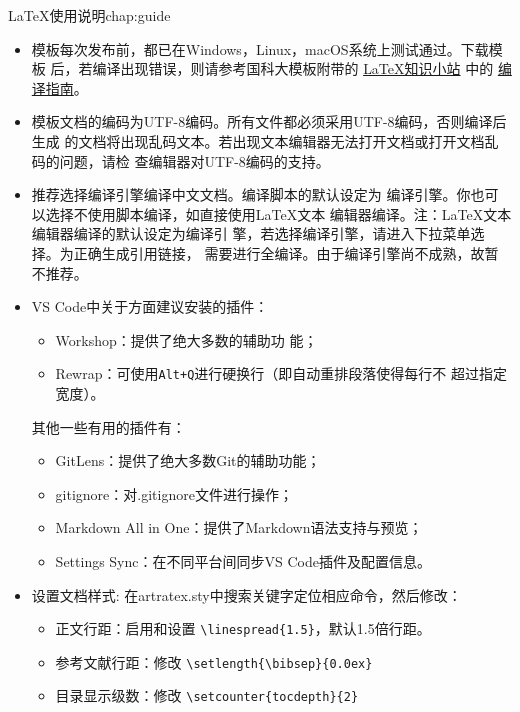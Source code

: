 \begin{cuzchapter}{\LaTeX{}使用说明}{chap:guide}
\begin{itemize}
    \item 模板每次发布前，都已在Windows，Linux，macOS系统上测试通过。下载模板
    后，若编译出现错误，则请参考国科大模板附带的
    \href{https://github.com/mohuangrui/ucasthesis/wiki}{\LaTeX{}知识小站} 中的
    \href{https://github.com/mohuangrui/ucasthesis/wiki/%E7%BC%96%E8%AF%91%E6%8C%87%E5%8D%97}{编
    译指南}。
    \item 模板文档的编码为UTF-8编码。所有文件都必须采用UTF-8编码，否则编译后生成
    的文档将出现乱码文本。若出现文本编辑器无法打开文档或打开文档乱码的问题，请检
    查编辑器对UTF-8编码的支持。
    \item 推荐选择编译引擎编译中文文档。编译脚本的默认设定为
    编译引擎。你也可以选择不使用脚本编译，如直接使用\LaTeX{}文本
    编辑器编译。注：\LaTeX{}文本编辑器编译的默认设定为编译引
    擎，若选择编译引擎，请进入下拉菜单选择。为正确生成引用链接，
    需要进行全编译。由于编译引擎尚不成熟，故暂不推荐。
    \item VS Code中关于方面建议安装的插件：
        \begin{itemize}
            \item {} Workshop：提供了绝大多数的辅助功
            能；
            \item Rewrap：可使用\verb|Alt+Q|进行硬换行（即自动重排段落使得每行不
            超过指定宽度）。
        \end{itemize}
        其他一些有用的插件有：
        \begin{itemize}
            \item GitLens：提供了绝大多数Git的辅助功能；
            \item gitignore：对.gitignore文件进行操作；
            \item Markdown All in One：提供了Markdown语法支持与预览；
            \item Settings Sync：在不同平台间同步VS Code插件及配置信息。
        \end{itemize}
    \item 设置文档样式: 在artratex.sty中搜索关键字定位相应命令，然后修改：
        \begin{itemize}
            \item 正文行距：启用和设置 \verb|\linespread{1.5}|，默认1.5倍行距。
            \item 参考文献行距：修改 \verb|\setlength{\bibsep}{0.0ex}|
            \item 目录显示级数：修改 \verb|\setcounter{tocdepth}{2}|

\end{itemize}
\end{itemize}
\end{cuzchapter}
